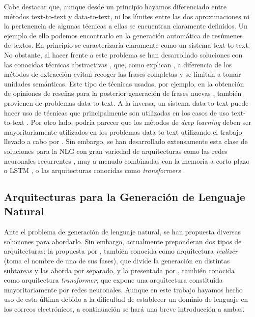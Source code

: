Cabe destacar que, aunque desde un principio hayamos diferenciado entre métodos text-to-text y data-to-text, ni los límites entre las dos aproximaciones ni la pertenencia de algunas técnicas a ellas se encuentran claramente definidos. Un ejemplo de ello podemos encontrarlo en la generación automática de resúmenes de textos. En principio se caracterizaría claramente como un sistema text-to-text. No obstante, al hacer frente a este problema se han desarrollado soluciones con las conocidas técnicas abstractivas \citep{genest2011framework}, que, como explican \cite{hahn2000challenges}, a diferencia de los métodos de extracción evitan recoger las frases completas y se limitan a tomar unidades semánticas. Este tipo de técnicas usadas, por ejemplo, en la obtención de opiniones de reseñas para la posterior generación de frases nuevas \citep{labbe2012towards}, también provienen de problemas data-to-text. A la inversa, un sistema data-to-text puede hacer uso de técnicas que principalmente son utilizadas en los casos de uso text-to-text \citep{mcintyre2009learning, kondadadi2013statistical}. Por otro lado, podría parecer que los métodos de \textit{deep learning} \citep{goodfellow2016deep} deben ser mayoritariamente utilizados en los problemas data-to-text utilizando el trabajo llevado a cabo por \cite{mikolov2013efficient}. Sin embargo, se han desarrollado extensamente esta clase de soluciones para la NLG con gran variedad de arquitecturas como las redes neuronales recurrentes \citep{cho2014learning, tang2016context}, muy a menudo combinadas con la memoria a corto plazo o LSTM \citep{chen2016enhanced}, o las arquitecturas conocidas como \textit{transformers} \citep{transformers}.

\subsection{Arquitecturas para la Generación de Lenguaje Natural}\label{ss:arqnlg}
Ante el problema de generación de lenguaje natural, se han propuesta diversas soluciones para abordarlo. Sin embargo, actualmente preponderan dos tipos de arquitecturas: la propuesta por \cite{biblia}, también conocida como arquitectura \textit{realizer} (toma el nombre de una de sus fases), que divide la generación en distintas subtareas y las aborda por separado, y la presentada por \cite{transformers}, también conocida como arquitectura \textit{transformer}, que expone una arquitectura constituida mayoritariamente por redes neuronales. Aunque en este trabajo hayamos hecho uso de esta última debido a la dificultad de establecer un dominio de lenguaje en los correos electrónicos, a continuación se hará una breve introducción a ambas.

